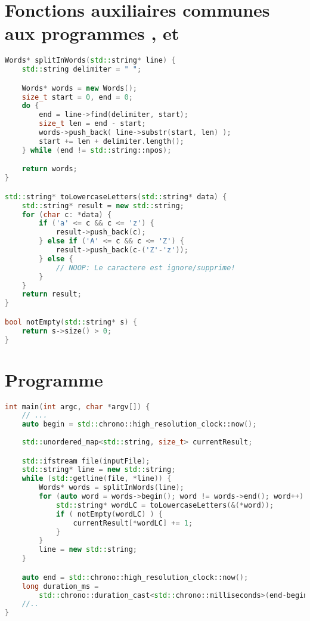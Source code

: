 \section{Fonctions auxiliaires communes aux programmes ,
 et }

\begin{lstlisting}[basicstyle=\ttfamily\footnotesize,language=c++]
Words* splitInWords(std::string* line) {
    std::string delimiter = " ";

    Words* words = new Words();
    size_t start = 0, end = 0;
    do {
        end = line->find(delimiter, start);
        size_t len = end - start;
        words->push_back( line->substr(start, len) );
        start += len + delimiter.length();
    } while (end != std::string::npos);

    return words;
}

std::string* toLowercaseLetters(std::string* data) {
    std::string* result = new std::string;
    for (char c: *data) {
        if ('a' <= c && c <= 'z') {
            result->push_back(c);
        } else if ('A' <= c && c <= 'Z') {
            result->push_back(c-('Z'-'z')); 
        } else {
            // NOOP: Le caractere est ignore/supprime!
        }
    }
    return result;
}

bool notEmpty(std::string* s) {
    return s->size() > 0;
}
\end{lstlisting}


\section{Programme }
\begin{lstlisting}[basicstyle=\ttfamily\footnotesize,language=c++]
int main(int argc, char *argv[]) {
	// ...
	auto begin = std::chrono::high_resolution_clock::now();
	
    std::unordered_map<std::string, size_t> currentResult;

    std::ifstream file(inputFile);
    std::string* line = new std::string;
    while (std::getline(file, *line)) {
        Words* words = splitInWords(line);
        for (auto word = words->begin(); word != words->end(); word++) {
            std::string* wordLC = toLowercaseLetters(&(*word));
            if ( notEmpty(wordLC) ) {
                currentResult[*wordLC] += 1;
            }
        }
        line = new std::string;
    }

    auto end = std::chrono::high_resolution_clock::now();
    long duration_ms = 
        std::chrono::duration_cast<std::chrono::milliseconds>(end-begin).count();
	//..
}
\end{lstlisting}

